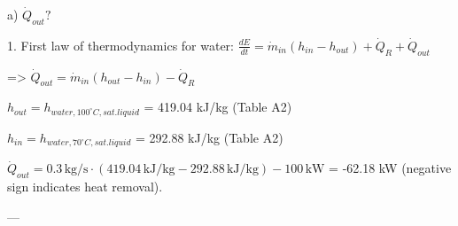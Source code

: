 a) \( \dot{Q}_{out}? \)  

1. First law of thermodynamics for water:  
\( \frac{dE}{dt} = \dot{m}_{in}(h_{in} - h_{out}) + \dot{Q}_R + \dot{Q}_{out} \)  

=> \( \dot{Q}_{out} = \dot{m}_{in}(h_{out} - h_{in}) - \dot{Q}_R \)  

\( h_{out} = h_{water, 100^\circ C, sat. liquid} \)  
= 419.04 kJ/kg (Table A2)  

\( h_{in} = h_{water, 70^\circ C, sat. liquid} \)  
= 292.88 kJ/kg (Table A2)  

\( \dot{Q}_{out} = 0.3 \, \text{kg/s} \cdot (419.04 \, \text{kJ/kg} - 292.88 \, \text{kJ/kg}) - 100 \, \text{kW} \)  
= -62.18 kW (negative sign indicates heat removal).  

---